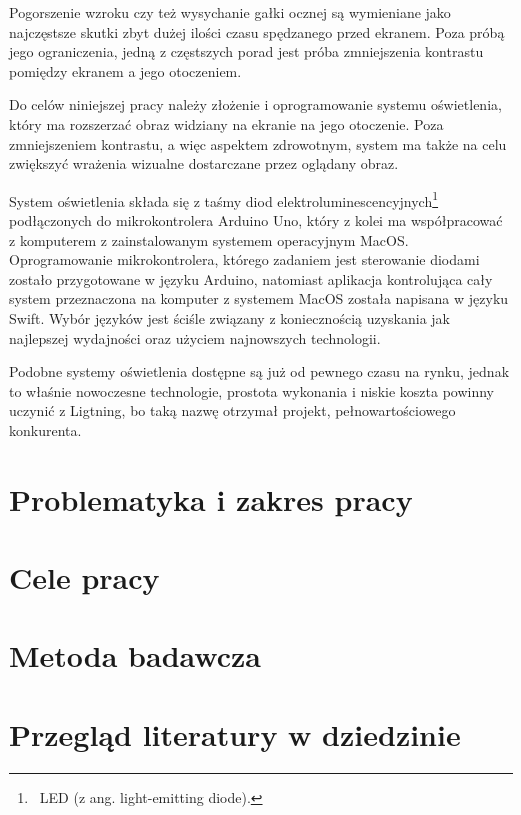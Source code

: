 \documentclass[12pt]{report}
\begin{document}
Pogorszenie wzroku czy też wysychanie gałki ocznej są wymieniane jako naj\-częstsze skutki zbyt dużej ilości czasu spędzanego przed ekranem. Poza próbą jego ograniczenia, jedną z częstszych porad jest próba zmniejszenia kontrastu pomiędzy ekranem a jego otoczeniem.

Do celów niniejszej pracy należy złożenie i oprogramowanie systemu oświetlenia, który ma rozszerzać obraz widziany na ekranie na jego otoczenie. Poza zmniejszeniem kontrastu, a więc aspektem zdrowotnym, system ma także na celu zwiększyć wrażenia wizualne dostarczane przez oglądany obraz.

System oświetlenia składa się z taśmy diod elektroluminescencyjnych\footnote{~LED (z ang. light-emitting diode).} pod\-łączonych do mikrokontrolera Arduino Uno, który z kolei ma współpracować z komputerem z zainstalowanym systemem operacyjnym MacOS. Oprogramowanie mikrokontrolera, którego zadaniem jest sterowanie diodami zostało przygotowane w języku Arduino, natomiast aplikacja kontrolująca cały system przeznaczona na komputer z systemem MacOS została napisana w języku Swift. Wybór języków jest ściśle związany z koniecznością uzyskania jak najlepszej wydajności oraz użyciem najnowszych technologii.

Podobne systemy oświetlenia dostępne są już od pewnego czasu na rynku, jednak to właśnie nowoczesne technologie, prostota wykonania i niskie koszta powinny uczynić z Ligtning, bo taką nazwę otrzymał projekt, pełnowartościowego konkurenta.

\section{Problematyka i zakres pracy}


\section{Cele pracy}


\section{Metoda badawcza}


\section{Przegląd literatury w dziedzinie}
\end{document}
